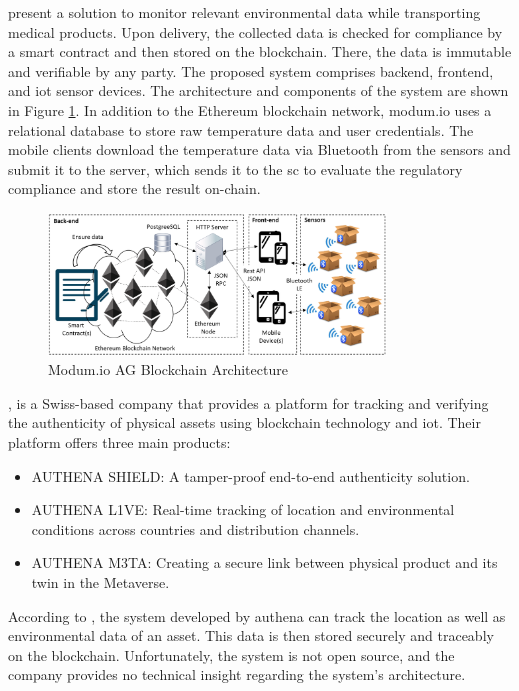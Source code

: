 \textcite{modum.io} present a solution to monitor relevant environmental data while transporting medical products. Upon delivery, the collected data is checked for compliance by a smart contract and then stored on the blockchain. There, the data is immutable and verifiable by any party. The proposed system comprises backend, frontend, and \gls{iot} sensor devices. The architecture and components of the system are shown in Figure \ref{fig:modum.io}. In addition to the Ethereum blockchain network, modum.io uses a relational database to store raw temperature data and user credentials. The mobile clients download the temperature data via Bluetooth from the sensors and submit it to the server, which sends it to the \gls{sc} to evaluate the regulatory compliance and store the result on-chain.

\begin{figure}[ht]
    \centering
    \includegraphics[width=0.8\textwidth]{diagrams/modum_architecutre.png}
    \caption{Modum.io AG Blockchain Architecture \cite{modum.io}}
    \label{fig:modum.io}
\end{figure}

\textcite{authena}, is a Swiss-based company that provides a platform for tracking and verifying the authenticity of physical assets using blockchain technology and \gls{iot}. Their platform offers three main products:
\begin{itemize}
    \item AUTHENA SHIELD: A tamper-proof end-to-end authenticity solution.
    \item AUTHENA L1VE: Real-time tracking of location and environmental conditions across countries and distribution channels.
    \item AUTHENA M3TA: Creating a secure link between physical product and its twin in the Metaverse.
\end{itemize}
According to \textcite{authenahandelszeitung}, the system developed by authena can track the location as well as environmental data of an asset. This data is then stored securely and traceably on the blockchain. Unfortunately, the system is not open source, and the company provides no technical insight regarding the system's architecture.


